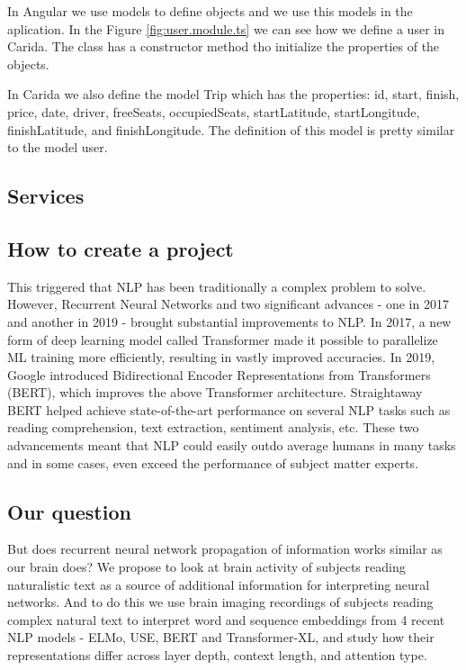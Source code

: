 \documentclass{article}
\begin{document}
    In Angular we use models to define objects and we use this models in the aplication. In the Figure \ref{fig:user.module.ts} we can see how we define a user in Carida. The class has a constructor method tho initialize the properties of the objects.

    In Carida we also define the model Trip which has the properties: id, start, finish, price, date, driver, freeSeats, occupiedSeats, startLatitude, startLongitude, finishLatitude, and finishLongitude. The definition of this model is pretty similar to the model user.

    
    \subsection*{Services}

  

    










  \subsection{How to create a project}
This triggered that NLP has been traditionally a complex problem to solve\cite{jones1992natural}. However, Recurrent Neural Networks and two significant advances - one in 2017 and another in 2019 - brought substantial improvements to NLP. In 2017, a new form of deep learning model called Transformer\cite{wang2019r} made it possible to parallelize ML training more efficiently, resulting in vastly improved accuracies.
In 2019, Google introduced Bidirectional Encoder Representations from Transformers (BERT)\cite{kamath2022bidirectional}, which improves the above Transformer architecture. Straightaway BERT helped achieve state-of-the-art performance\cite{DBLP:journals/corr/abs-1810-04805} on several NLP tasks such as reading comprehension, text extraction, sentiment analysis, etc. These two advancements meant that NLP could easily outdo average humans in many tasks and in some cases, even exceed the performance of subject matter experts. 
\subsection{Our question}
But does recurrent neural network propagation of information works similar as our brain does? We propose to look at brain activity of subjects reading naturalistic text as a source of additional information for interpreting neural networks. And to do this we use brain imaging recordings of subjects reading complex natural text to interpret word and sequence embeddings from 4 recent NLP models - ELMo, USE, BERT and Transformer-XL, and study how their representations differ across layer depth, context length, and attention type.
\end{document}
